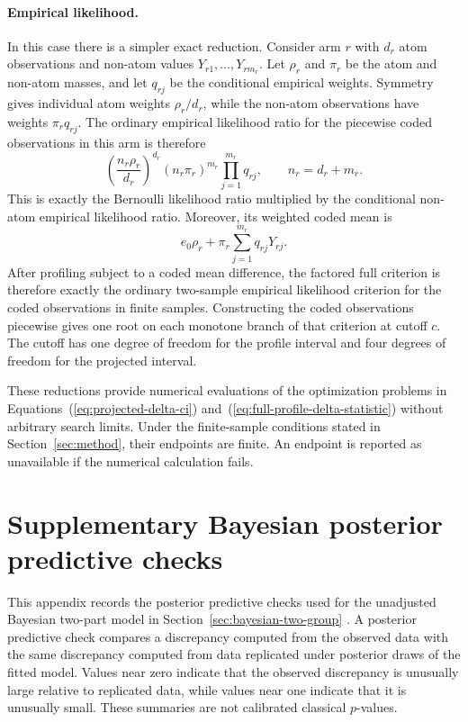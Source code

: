 \documentclass[11pt]{article}
\begin{document}
\paragraph{Empirical likelihood.}
In this case there is a simpler exact reduction. Consider arm $r$ with $d_r$ atom observations and non-atom values $Y_{r1},\ldots,Y_{rm_r}$. Let $\rho_r$ and $\pi_r$ be the atom and non-atom masses, and let $q_{rj}$ be the conditional empirical weights. Symmetry gives individual atom weights $\rho_r/d_r$, while the non-atom observations have weights $\pi_r q_{rj}$. The ordinary empirical likelihood ratio for the piecewise coded observations in this arm is therefore
\[
  \left(\frac{n_r\rho_r}{d_r}\right)^{d_r}
  (n_r\pi_r)^{m_r}\prod_{j=1}^{m_r} q_{rj},
  \qquad n_r=d_r+m_r.
\]
This is exactly the Bernoulli likelihood ratio multiplied by the conditional non-atom empirical likelihood ratio. Moreover, its weighted coded mean is
\[
  e_0\rho_r+\pi_r\sum_{j=1}^{m_r} q_{rj}Y_{rj}.
\]
After profiling subject to a coded mean difference, the factored full criterion is therefore exactly the ordinary two-sample empirical likelihood criterion for the coded observations in finite samples. Constructing the coded observations piecewise gives one root on each monotone branch of that criterion at cutoff $c$. The cutoff has one degree of freedom for the profile interval and four degrees of freedom for the projected interval.

These reductions provide numerical evaluations of the optimization problems in Equations~(\ref{eq:projected-delta-ci}) and~(\ref{eq:full-profile-delta-statistic}) without arbitrary search limits. Under the finite-sample conditions stated in Section~\ref{sec:method}, their endpoints are finite. An endpoint is reported as unavailable if the numerical calculation fails.


\section{Supplementary Bayesian posterior predictive checks}
\label{app:bayesian-ppc}

This appendix records the posterior predictive checks used for the unadjusted
Bayesian two-part model in Section~\ref{sec:bayesian-two-group} \citep{gelman1996posterior}. A posterior
predictive check compares a discrepancy computed from the observed data with
the same discrepancy computed from data replicated under posterior draws of the
fitted model. Values near zero indicate that the observed discrepancy is unusually large relative to replicated data, while values near one indicate that it is unusually small. These summaries are not calibrated classical $p$-values.
\end{document}
